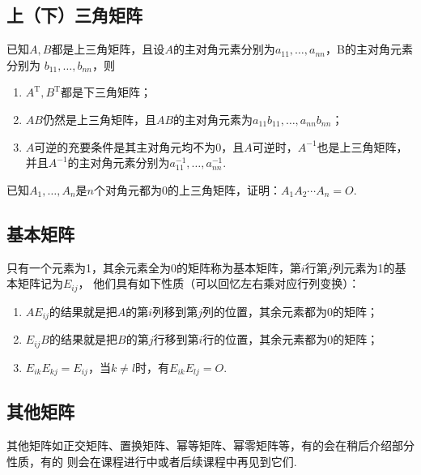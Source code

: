 \subsection{上（下）三角矩阵}
\begin{theorem}
    已知$A,B$都是上三角矩阵，且设$A$的主对角元素分别为$a_{11},\ldots,a_{nn}$，B的主对角元素分别为
    $b_{11},\ldots,b_{nn}$，则
    \begin{enumerate}
        \item $A^{\mathrm{T}}, B^\mathrm{T}$都是下三角矩阵；

        \item $AB$仍然是上三角矩阵，且$AB$的主对角元素为$a_{11}b_{11},\ldots,a_{nn}b_{nn}$；

        \item $A$可逆的充要条件是其主对角元均不为$0$，且$A$可逆时，$A^{-1}$也是上三角矩阵，并且$A^{-1}$的主对角元素分别为$a_{11}^{-1},\ldots,a_{nn}^{-1}$.
    \end{enumerate}
\end{theorem}

\begin{example}
    已知$A_1,\ldots,A_n$是$n$个对角元都为$0$的上三角矩阵，证明：$A_1A_2\cdots A_n=O$.
\end{example}

\subsection{基本矩阵}
只有一个元素为1，其余元素全为0的矩阵称为基本矩阵，第$i$行第$j$列元素为1的基本矩阵记为$E_{ij}$，
他们具有如下性质（可以回忆左右乘对应行列变换）：
\begin{theorem}
    \begin{enumerate}
        \item $AE_{ij}$的结果就是把$A$的第$i$列移到第$j$列的位置，其余元素都为$0$的矩阵；

        \item $E_{ij}B$的结果就是把$B$的第$j$行移到第$i$行的位置，其余元素都为$0$的矩阵；

        \item $E_{ik}E_{kj}=E_{ij}$，当$k \neq l$时，有$E_{ik}E_{lj}=O$.
    \end{enumerate}
\end{theorem}

\subsection{其他矩阵}
其他矩阵如正交矩阵、置换矩阵、幂等矩阵、幂零矩阵等，有的会在稍后介绍部分性质，有的
则会在课程进行中或者后续课程中再见到它们.

